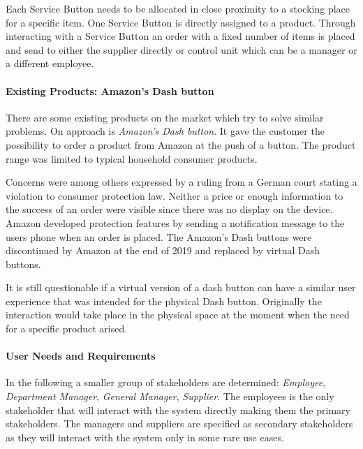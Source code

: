 Each Service Button needs to be allocated in close proximity to a stocking place for a specific item. One Service Button is directly assigned to a product. Through interacting with a Service Button an order with a fixed number of items is placed and send to either the supplier directly or control unit which can be a manager or a different employee.

\paragraph{Existing Products: Amazon's Dash button}

There are some existing products on the market which try to solve similar problems. On approach is \textit{Amazon's Dash button}. It gave the customer the possibility to order a product from Amazon at the push of a button. The product range was limited to typical household consumer products. 

Concerns were among others expressed by a ruling from a German court stating a violation to consumer protection law. Neither a price or enough information to the success of an order were visible since there was no display on the device. Amazon developed protection features by sending a notification message to the users phone when an order is placed. The Amazon's Dash buttons were discontinued by Amazon at the end of 2019 and replaced by virtual Dash buttons. \cite{Online:TheVerge:DashbuttonCourt, Online:TheVerge:DashbuttonDiscontinued}

It is still questionable if a virtual version of a dash button can have a similar user experience that was intended for the physical Dash button. Originally the interaction would take place in the physical space at the moment when the need for a specific product arised.

\paragraph{User Needs and Requirements}


In the following a smaller group of stakeholders are determined: \textit{Employee}, \textit{Department Manager}, \textit{General Manager}, \textit{Supplier}. The employees is the only stakeholder that will interact with the system directly making them the primary stakeholders. The managers and suppliers are specified as secondary stakeholders as they will interact with the system only in some rare use cases.

